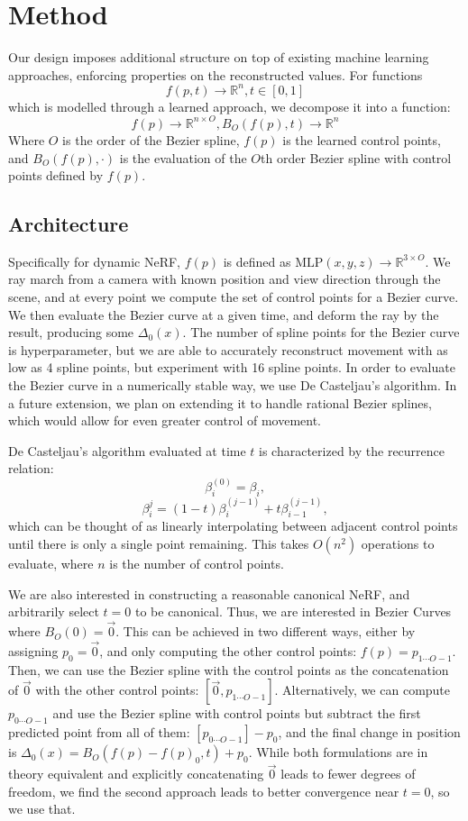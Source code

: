 \section*{Method}

Our design imposes additional structure on top of existing machine learning
approaches, enforcing properties on the reconstructed values. For functions \[ f(p, t)\to\mathbb{R}^n, t\in[0,1] \] which is modelled through
a learned approach, we decompose it into a function: \[ f(p)\to\mathbb{R}^{n\times O}, B_O(f(p), t)\to\mathbb{R}^n
\] Where
$O$ is the order of the Bezier spline, $f(p)$ is the learned control points, and $B_O(f(p), \cdot)$ is the evaluation
of the $O$th order Bezier spline with control points defined by $f(p)$.

\subsection*{Architecture}

Specifically for dynamic NeRF, $f(p)$ is defined as
$\text{MLP}(x,y,z)\to\mathbb{R}^{3\times O}$. We ray march from a camera with known position and
view direction through the scene, and at every point we compute the set of control points for a Bezier curve. We then evaluate the Bezier curve at a given time, and deform the ray by the result, producing some $\Delta_0(x)$. The number of spline points for the Bezier curve is hyperparameter, but we are able
to accurately reconstruct movement with as low as 4 spline points, but experiment with 16 spline points. In order to evaluate the Bezier curve in a numerically stable way, we use De Casteljau's
algorithm. In a future extension, we plan on extending it to handle rational Bezier splines, which would allow for even greater control of movement.

De Casteljau's algorithm evaluated at time $t$ is characterized by the recurrence relation:
\[ \beta_i^{(0)} = \beta_i, \]
\[ \beta_i^{j} = (1-t)\beta_i^{(j-1)} + t\beta_{i-1}^{(j-1)}, \]
which can be thought of as linearly interpolating between adjacent control points until there is only a single point remaining. This takes $O(n^2)$ operations to evaluate, where $n$ is the number of control points.

We are also interested in constructing a reasonable canonical NeRF, and arbitrarily select $t = 0$ to be canonical. Thus, we are interested in Bezier Curves where $B_O(0) = \overrightarrow{0}$. This can be achieved in two different ways, either by assigning $p_0 = \overrightarrow{0}$, and only computing the other control points: $f(p) = p_{1\cdots O-1}$. Then, we can use the Bezier spline with the control points as the concatenation of $\overrightarrow{0}$ with the other control points: $[\overrightarrow{0}, p_{1\cdots O-1}]$. Alternatively, we can compute $p_{0\cdots O-1}$ and use the Bezier spline with control points but subtract the first predicted point from all of them: $[p_{0\cdots O-1}]-p_0$, and the final change in position is $\Delta_0(x) = B_O(f(p)-f(p)_0,t)+p_0$. While both formulations are in theory equivalent and explicitly concatenating $\overrightarrow{0}$ leads to fewer degrees of freedom, we find the second approach leads to better convergence near $t=0$, so we use that.

